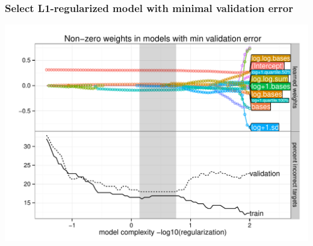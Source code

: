 \documentclass{beamer}
\begin{document}
\begin{frame}
  \frametitle{Select L1-regularized model with minimal validation error}

  \includegraphics[height=0.9\textheight]{figure-lasso-path}
\end{frame}
\end{document}
